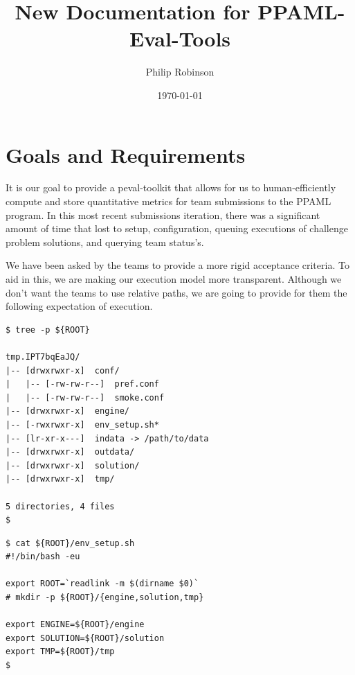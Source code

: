 \documentclass[11pt]{article} %
\title{New Documentation for PPAML-Eval-Tools}
\date{\today}
\author{Philip Robinson}
\def\ptk{peval-toolkit\xspace}
\def\ppaml{PPAML\xspace}
\begin{document}
\pagestyle{empty}
\clearpage\maketitle

  \section*{Goals and Requirements}

  It is our goal to provide a \ptk that allows for us to human-efficiently compute and store quantitative metrics for team submissions to the \ppaml program. In this most recent submissions iteration, there was a significant amount of time that lost to setup, configuration, queuing executions of challenge problem solutions, and querying team status's. 

    We have been asked by the teams to provide a more rigid acceptance criteria. To aid in this, we are making our execution model more transparent. Although we don't want the teams to use relative paths, we are going to provide for them the following expectation of execution.

\begin{multicols}{2}
\begin{lstlisting}
$ tree -p ${ROOT}

tmp.IPT7bqEaJQ/
|-- [drwxrwxr-x]  conf/
|   |-- [-rw-rw-r--]  pref.conf
|   |-- [-rw-rw-r--]  smoke.conf
|-- [drwxrwxr-x]  engine/
|-- [-rwxrwxr-x]  env_setup.sh*
|-- [lr-xr-x---]  indata -> /path/to/data
|-- [drwxrwxr-x]  outdata/
|-- [drwxrwxr-x]  solution/
|-- [drwxrwxr-x]  tmp/

5 directories, 4 files
$
\end{lstlisting}
\vfill\columnbreak
\begin{lstlisting}
$ cat ${ROOT}/env_setup.sh 
#!/bin/bash -eu

export ROOT=`readlink -m $(dirname $0)`
# mkdir -p ${ROOT}/{engine,solution,tmp}

export ENGINE=${ROOT}/engine
export SOLUTION=${ROOT}/solution
export TMP=${ROOT}/tmp
$
\end{lstlisting}
\end{multicols}
\end{document}
